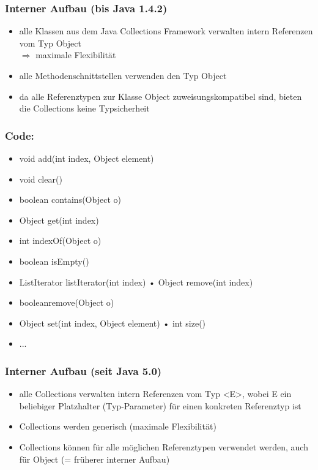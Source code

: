 \documentclass[a4paper,10pt]{article}
\begin{document}
\subsubsection{Interner Aufbau (bis Java 1.4.2)}
\begin{itemize}
	\item alle Klassen aus dem Java Collections Framework verwalten intern Referenzen vom Typ Object \\ $\Rightarrow$ maximale Flexibilit\"at
	\item alle Methodenschnittstellen verwenden den Typ Object
	\item da alle Referenztypen zur Klasse Object zuweisungskompatibel sind, bieten die Collections keine Typsicherheit
\end{itemize}

\subsubsection*{Code:}
\begin{itemize}
	\item void add(int index, Object element)
	\item void clear()
	\item boolean contains(Object o)
	\item Object get(int index)
	\item  int indexOf(Object o)
	\item boolean isEmpty()
	\item ListIterator listIterator(int index) • Object remove(int index)
	\item booleanremove(Object o)
	\item Object set(int index, Object element) • int size()
	\item ...
\end{itemize}

\subsubsection{Interner Aufbau (seit Java 5.0)}
\begin{itemize}
	\item alle Collections verwalten intern Referenzen vom Typ <E>, wobei E ein beliebiger Platzhalter (Typ-Parameter) f\"ur einen konkreten Referenztyp ist
	\item Collections werden generisch (maximale Flexibilit\"at)
	\item Collections k\"onnen f\"ur alle m\"oglichen Referenztypen verwendet werden, auch
f\"ur Object (= fr\"uherer interner Aufbau)
\end{itemize}
\end{document}
